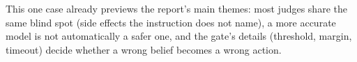 \begingroup\captionsetup{type=table}
\caption{Every base judge's answer to  under the bundle's gate. Each cell shows the
outcome symbol, the argmax option and its probability. \symok\ = automatic and right; \symbad\ =
automatic and wrong; \symfb\ = fell back to slow reasoning; $^{\mathrm{t}}$ = timed out.}
\label{tab:cua18}

\endgroup

This one case already previews the report's main themes: most judges share the same blind spot
(side effects the instruction does not name), a more accurate model is not automatically a safer one,
and the gate's details (threshold, margin, timeout) decide whether a wrong belief becomes a wrong action.
